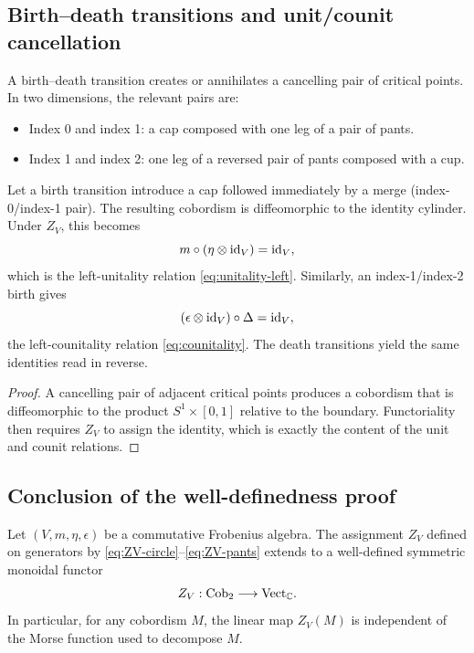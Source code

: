 \subsection{Birth--death transitions and unit/counit cancellation}

A birth--death transition creates or annihilates a cancelling pair of critical points. In two dimensions, the relevant pairs are:
\begin{itemize}
\item Index 0 and index 1: a cap composed with one leg of a pair of pants.
\item Index 1 and index 2: one leg of a reversed pair of pants composed with a cup.
\end{itemize}

\begin{lemma}\label{lem:birth-death}
Let a birth transition introduce a cap followed immediately by a merge (index-0/index-1 pair). The resulting cobordism is diffeomorphic to the identity cylinder. Under $Z_V$, this becomes
\begin{equation}\label{eq:birth-death-0-1}
m \circ (\eta \otimes \operatorname{id}_V) = \operatorname{id}_V,
\end{equation}
which is the left-unitality relation \eqref{eq:unitality-left}. Similarly, an index-1/index-2 birth gives
\begin{equation}\label{eq:birth-death-1-2}
(\epsilon \otimes \operatorname{id}_V) \circ \Delta = \operatorname{id}_V,
\end{equation}
the left-counitality relation \eqref{eq:counitality}. The death transitions yield the same identities read in reverse.
\end{lemma}

\begin{proof}
A cancelling pair of adjacent critical points produces a cobordism that is diffeomorphic to the product $S^1 \times [0,1]$ relative to the boundary. Functoriality then requires $Z_V$ to assign the identity, which is exactly the content of the unit and counit relations.
\end{proof}

\subsection{Conclusion of the well-definedness proof}

\begin{theorem}\label{thm:ZV-well-defined}
Let $(V,m,\eta,\epsilon)$ be a commutative Frobenius algebra. The assignment $Z_V$ defined on generators by \eqref{eq:ZV-circle}--\eqref{eq:ZV-pants} extends to a well-defined symmetric monoidal functor
\begin{equation}\label{eq:ZV-functor}
Z_V : \mathrm{Cob}_2 \longrightarrow \mathrm{Vect}_{\mathbb{C}}.
\end{equation}
In particular, for any cobordism $M$, the linear map $Z_V(M)$ is independent of the Morse function used to decompose $M$.
\end{theorem}

